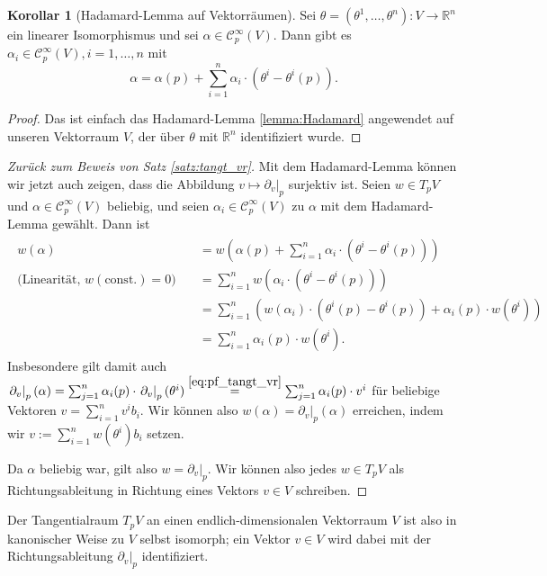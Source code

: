 \documentclass[a4paper]{scrbook}
\numberwithin{equation}{chapter}
\newcommand{\sC}{\mathcal{C}^{\infty}}
\theoremstyle{definition}
\newtheorem{kor}[defn]{Korollar}
\begin{document}
\begin{kor}[Hadamard-Lemma auf Vektorräumen]
	Sei $\theta = (\theta^1, \dots, \theta^n) \colon V \to \mathbb R^n$ ein linearer Isomorphismus und sei $\alpha \in \sC_p(V)$. Dann gibt es $\alpha_i \in \sC_p(V), i = 1,\dots, n$ mit \[\alpha = \alpha(p) + \sum_{i=1}^n \alpha_i \cdot (\theta^i - \theta^i(p)).\]
	
	\begin{proof}
		Das ist einfach das Hadamard-Lemma \ref{lemma:Hadamard} angewendet auf unseren Vektorraum $V$, der über $\theta$ mit $\mathbb R^n$ identifiziert wurde.
	\end{proof}
\end{kor}

\begin{proof}[Zurück zum Beweis von Satz \ref{satz:tangt_vr}]
	Mit dem Hadamard-Lemma können wir jetzt auch zeigen, dass die Abbildung $v \mapsto \left.\partial_v\right|_p$ surjektiv ist. Seien $w \in T_pV$ und $\alpha \in \sC_p(V)$ beliebig, und seien $\alpha_i \in \sC_p(V)$ zu $\alpha$ mit dem Hadamard-Lemma gewählt. Dann ist
	\begin{align}\begin{split}
		w(\alpha) &= w\left(\alpha(p) + \sum_{i=1}^n \alpha_i \cdot (\theta^i - \theta^i(p))\right)\\
		\text{(Linearität, $w(\text{const.}) = 0$)} \quad &= \sum_{i=1}^n w(\alpha_i \cdot (\theta^i - \theta^i(p)))\\
		&= \sum_{i=1}^n \left( w(\alpha_i) \cdot (\theta^i(p) - \theta^i(p)) + \alpha_i(p) \cdot w(\theta^i) \right)\\
		&= \sum_{i=1}^n \alpha_i(p) \cdot w(\theta^i).
	\end{split}\end{align}
	Insbesondere gilt damit auch $\left.\partial_v\right|_p (\alpha) = \sum_{j=1}^n \alpha_i(p) \cdot \left.\partial_v\right|_p (\theta^i) \overset{\eqref{eq:pf_tangt_vr}}{=} \sum_{j=1}^n \alpha_i(p) \cdot v^i$ für beliebige Vektoren $v = \sum_{i=1}^n v^i b_i$. Wir können also $w(\alpha) = \left.\partial_v\right|_p (\alpha)$ erreichen, indem wir $v := \sum_{i=1}^n w(\theta^i) b_i$ setzen.

	Da $\alpha$ beliebig war, gilt also $w = \left.\partial_v\right|_p$. Wir können also jedes $w \in T_pV$ als Richtungsableitung in Richtung eines Vektors $v\in V$ schreiben.
\end{proof}

Der Tangentialraum $T_pV$ an einen endlich-dimensionalen Vektorraum $V$ ist also in kanonischer Weise zu $V$ selbst isomorph; ein Vektor $v \in V$ wird dabei mit der Richtungsableitung $\left.\partial_v\right|_p$ identifiziert.
\end{document}

